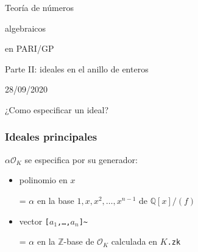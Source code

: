 \documentclass{beamer}
\newcommand{\ZZ}{\mathbb{Z}}
\newcommand{\QQ}{\mathbb{Q}}
\renewcommand{\O}{\mathcal{O}}
\begin{document}

\begin{frame}[noframenumbering]
  \headingfont
  \begin{center}
    {\huge Teoría de números

      algebraicos

      en PARI/GP

    }

    \vspace{3em}

    {\large Parte II: ideales en el anillo de enteros}

    \vspace{3em}

    28/09/2020

  \end{center}
\end{frame}


\begin{frame}[plain]
  \headingfont

  \begin{center}
    {\huge ¿Como especificar un ideal?}
  \end{center}
\end{frame}


\begin{frame}
  \frametitle{Ideales principales}

  $\alpha\O_K$ se especifica por su generador:

  \begin{itemize}
  \item polinomio en $x$

    = $\alpha$ en la base $1,x,x^2,\ldots,x^{n-1}$ de $\QQ[x]/(f)$

  \item vector \texttt{[$a_1$,\ldots,$a_n$]\textasciitilde}

    = $\alpha$ en la $\ZZ$-base de $\O_K$ calculada en \texttt{$K$.zk}
  \end{itemize}

\end{frame}

\end{document}
